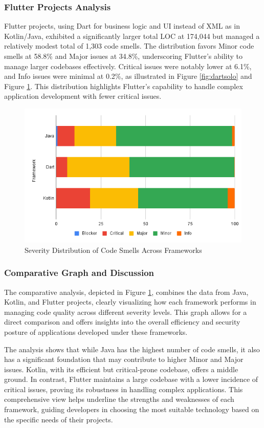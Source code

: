 \subsubsection{Flutter Projects Analysis}
Flutter projects, using Dart for business logic and UI instead of XML as in Kotlin/Java, exhibited a significantly larger total LOC at 174,044 but managed a relatively modest total of 1,303 code smells. The distribution favors Minor code smells at 58.8\% and Major issues at 34.8\%, underscoring Flutter's ability to manage larger codebases effectively. Critical issues were notably lower at 6.1\%, and Info issues were minimal at 0.2\%, as illustrated in Figure \ref{fig:dartsolo} and Figure \ref*{fig:totalsolo}. This distribution highlights Flutter's capability to handle complex application development with fewer critical issues.
 

\begin{figure}[htbp]
    \centering
    \includegraphics[scale = 0.58]{img/totalsolo.png}
    \caption{Severity Distribution of Code Smells Across Frameworks}
    \label{fig:totalsolo}
\end{figure}
\subsubsection{Comparative Graph and Discussion}
The comparative analysis, depicted in Figure \ref{fig:totalsolo}, combines the data from Java, Kotlin, and Flutter projects, clearly visualizing how each framework performs in managing code quality across different severity levels. This graph allows for a direct comparison and offers insights into the overall efficiency and security posture of applications developed under these frameworks.
\par
The analysis shows that while Java has the highest number of code smells, it also has a significant foundation that may contribute to higher Minor and Major issues. Kotlin, with its efficient but critical-prone codebase, offers a middle ground. In contrast, Flutter maintains a large codebase with a lower incidence of critical issues, proving its robustness in handling complex applications. This comprehensive view helps underline the strengths and weaknesses of each framework, guiding developers in choosing the most suitable technology based on the specific needs of their projects.
